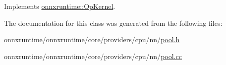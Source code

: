 Implements \mbox{\hyperlink{classonnxruntime_1_1OpKernel_a9eca8656a78b1b3ab9d3351a12798650}{onnxruntime\+::\+Op\+Kernel}}.



The documentation for this class was generated from the following files\+:\begin{DoxyCompactItemize}
\item 
onnxruntime/onnxruntime/core/providers/cpu/nn/\mbox{\hyperlink{cpu_2nn_2pool_8h}{pool.\+h}}\item 
onnxruntime/onnxruntime/core/providers/cpu/nn/\mbox{\hyperlink{cpu_2nn_2pool_8cc}{pool.\+cc}}\end{DoxyCompactItemize}
